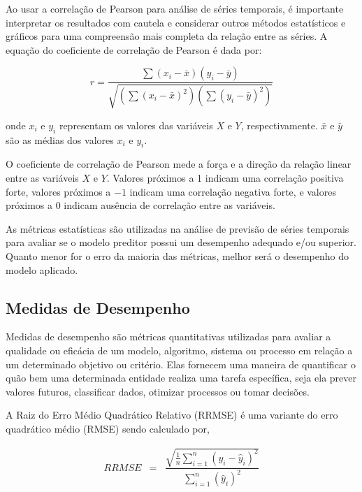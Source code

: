 Ao usar a correlação de Pearson para análise de séries temporais, é importante interpretar os resultados com cautela e considerar outros métodos estatísticos e gráficos para uma compreensão mais completa da relação entre as séries. A equação do coeficiente de correlação de Pearson é dada por:
 
 \begin{equation}
 	r=\frac{\sum\left(x_i-\bar{x}\right)\left(y_i-\bar{y}\right)}{\sqrt{\left(\sum\left(x_i-\bar{x}\right)^2\right)\left(\sum\left(y_i-\bar{y}\right)^2\right)}}
 \end{equation}
 
 \noindent onde $x_i$ e $y_i$ representam os valores das variáveis $X$ e $Y$, respectivamente. $\bar{x}$ e $\bar{y}$ são as médias dos valores $x_i$ e $y_i$. 
 
 O coeficiente de correlação de Pearson mede a força e a direção da relação linear entre as variáveis $X$ e $Y$. Valores próximos a 1 indicam uma correlação positiva forte, valores próximos a $-1$ indicam uma correlação negativa forte, e valores próximos a $0$ indicam  ausência de correlação entre as variáveis.
 
 As métricas estatísticas são utilizadas na análise de previsão de séries temporais para avaliar se o modelo preditor possui um desempenho adequado e/ou superior. Quanto menor for o erro da maioria das métricas, melhor será o desempenho do modelo aplicado.

 
 \subsection{Medidas de Desempenho}\label{subsec:metrica}

Medidas de desempenho são métricas quantitativas utilizadas para avaliar a qualidade ou eficácia de um modelo, algoritmo, sistema ou processo em relação a um determinado objetivo ou critério. Elas fornecem uma maneira de quantificar o quão bem uma determinada entidade realiza uma tarefa específica, seja ela prever valores futuros, classificar dados, otimizar processos ou tomar decisões.




 
A Raiz do Erro Médio Quadrático Relativo (RRMSE) é uma variante do erro quadrático médio (RMSE) sendo calculado por,
 
 \begin{eqnarray}
 	R R M S E&=&\dfrac{\sqrt{\frac{1}{n} \sum_{i=1}^n\left(y_i-\hat{y}_i\right)^2}}{\sum_{i=1}^n\left(\hat{y}_i\right)^2}
 \end{eqnarray}
 
